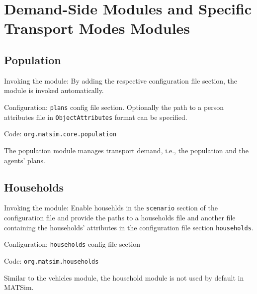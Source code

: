 \section{Demand-Side Modules and Specific Transport Modes Modules}
\label{sec:dsm}

\subsection{Population}
\label{sec:population}
\begin{compactitem}
\item Invoking the module: By adding the respective configuration file section, the module is invoked automatically.
\item Configuration: \lstinline|plans| config file section. Optionally the path to a person attributes file in \lstinline|ObjectAttributes| format can be specified.
\item Code: \lstinline|org.matsim.core.population|
\end{compactitem}

The population module manages transport demand, i.e., the population and the agents' plans.
\subsection{Households}
\label{sec:households}
\begin{compactitem}
\item Invoking the module: Enable househlds in the \lstinline|scenario| section of the configuration file and provide the paths to a households file and another file containing the households' attributes in the configuration file section \lstinline|households|.
\item Configuration: \lstinline|households| config file section
\item Code: \lstinline|org.matsim.households|
\end{compactitem}

Similar to the vehicles module, the household module is not used by default in MATSim.

